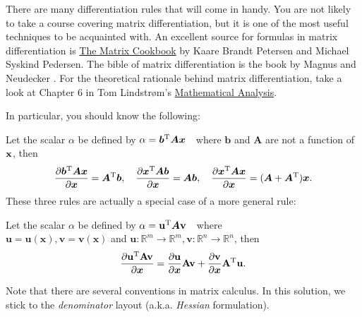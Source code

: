 \vspace{1cm}
There are many differentiation rules that will come in handy. You are not likely to take a course covering matrix differentiation, but it is one of the most useful techniques to be acquainted with. An excellent source for formulas in matrix differentiation is \href{https://www.math.uwaterloo.ca/~hwolkowi/matrixcookbook.pdf}{The Matrix Cookbook} by Kaare Brandt Petersen and Michael Syskind Pedersen. The bible of matrix differentiation is the book by Magnus and Neudecker \cite{Magnus2019-cz}. For the theoretical rationale behind matrix differentiation, take a look at Chapter 6 in Tom Lindstrøm's \href{https://www.uio.no/studier/emner/matnat/math/MAT2400/v16/spaces.pdf}{Mathematical Analysis}.

In particular, you should know the following:

\begin{framed}
Let the scalar $\alpha$ be defined by $\alpha = \bm{b}^{\rm T}\bm{A}\bm{x}$~~where $\bm{b}$ and $\bm{A}$ are not a function of $\bf{x}$, then
\begin{align*}
\frac{\partial \bm{b}^{\rm T}\bm{A}\bm{x}}{\partial \bm{x}} = \bm{A}^{\rm T}\bm{b},\quad
\frac{\partial \bm{x}^{\rm T}\bm{A}\bm{b}}{\partial \bm{x}} = \bm{A}\bm{b},\quad
\frac{\partial \bm{x}^{\rm T}\bm{A}\bm{x}}{\partial \bm{x}} = (\bm{A}+\bm{A}^{\rm T})\bm{x}.\\
\end{align*}
These three rules are actually a special case of a more general rule:

Let the scalar $\alpha$ be defined by $\alpha = \mathbf{u}^{\rm T}\bm{A}\mathbf{v}$~~where\\
 $\mathbf{u} = \mathbf{u}(\bm{x}), \mathbf{v} = \mathbf{v}(\bm{x})$ and $\mathbf{u}: \mathbb{R}^m \rightarrow \mathbb{R}^m, \mathbf{v}: \mathbb{R}^n \rightarrow \mathbb{R}^n$, then
\begin{align*}
\frac{\partial \mathbf{u}^{\rm T}{\mathbf{A}}\mathbf{v}}{\partial \bm{x}} = 
\frac{\partial \mathbf{u}}{\partial \bm{x}}{\mathbf{A}}{\mathbf{v}} + \frac{\partial \mathbf{v}}{\partial \bm{x}}\mathbf{A}^{\rm T}\mathbf {u}.
\end{align*}

Note that there are several conventions in matrix calculus. In this solution, we stick to the \textit{denominator} layout (a.k.a. \textit{Hessian} formulation).
\end{framed}
